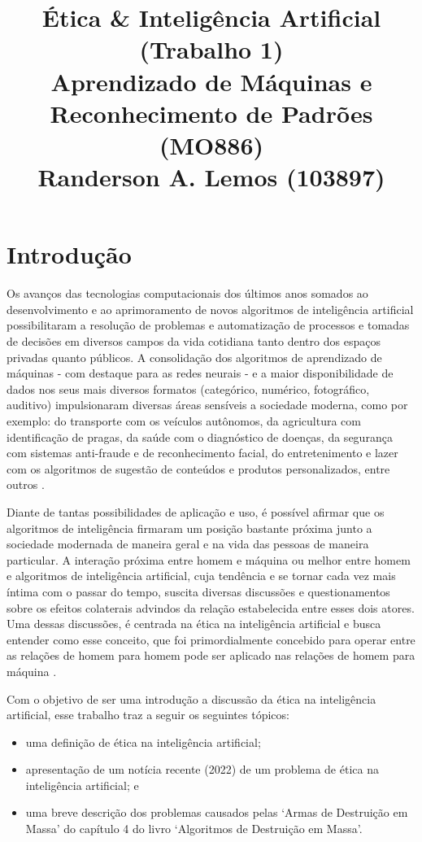 \documentclass{article}
\title{
	Ética \& Inteligência Artificial (Trabalho 1) \\
	\Large Aprendizado de Máquinas e Reconhecimento de Padrões (MO886) \\
	Randerson A. Lemos (103897)
}
\date{\vspace{-5ex}}
\begin{document}
  \maketitle

%
\section*{Introdução}

Os avanços das tecnologias computacionais dos últimos anos somados ao desenvolvimento e ao aprimoramento de novos algoritmos de inteligência artificial possibilitaram a resolução de problemas e automatização de processos e tomadas de decisões em diversos campos da vida cotidiana tanto dentro dos espaços privadas quanto públicos. A consolidação dos algoritmos de aprendizado de máquinas - com destaque para as redes neurais - e a maior disponibilidade de dados nos seus mais diversos formatos (categórico, numérico, fotográfico, auditivo) impulsionaram diversas áreas sensíveis a sociedade moderna, como por exemplo: do transporte com os veículos autônomos, da agricultura com identificação de pragas, da saúde com o diagnóstico de doenças, da segurança com sistemas anti-fraude e de reconhecimento facial, do entretenimento e lazer com os algoritmos de sugestão de conteúdos e produtos personalizados, entre outros \cite{Ludermir_2021}.

Diante de tantas possibilidades de aplicação e uso, é possível afirmar que os algoritmos de inteligência firmaram um posição bastante próxima junto a sociedade modernada de maneira geral e na vida das pessoas de maneira particular. A interação próxima entre homem e máquina ou melhor entre homem e algoritmos de inteligência artificial, cuja tendência e se tornar cada vez mais íntima com o passar do tempo, suscita diversas discussões e questionamentos sobre os efeitos colaterais advindos da relação estabelecida entre esses dois atores. Uma dessas discussões, é centrada na ética na inteligência artificial e busca entender como esse conceito, que foi primordialmente concebido para operar entre as relações de homem para homem pode ser aplicado nas relações de homem para máquina \cite{Ludermir_2021}. 

Com o objetivo de ser uma introdução a discussão da ética na inteligência artificial, esse trabalho traz a seguir os seguintes tópicos:
\begin{itemize}
	\item uma definição de ética na inteligência artificial;
	\item apresentação de um notícia recente (2022) de um problema de ética na inteligência artificial; e
	\item uma breve descrição dos problemas causados pelas `Armas de Destruição em Massa' do capítulo 4 do livro `Algoritmos de Destruição em Massa'.
\end{itemize}
\end{document}
